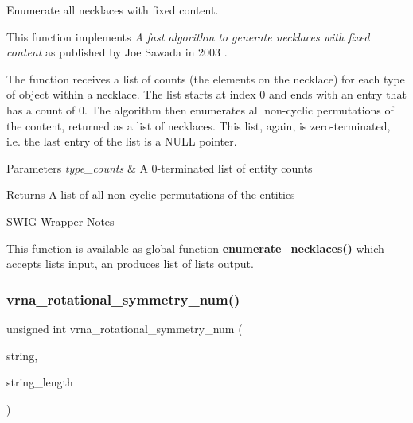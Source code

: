 Enumerate all necklaces with fixed content. 

This function implements {\itshape A fast algorithm to generate necklaces with fixed content} as published by Joe Sawada in 2003 \cite{sawada:2003}.

The function receives a list of counts (the elements on the necklace) for each type of object within a necklace. The list starts at index 0 and ends with an entry that has a count of 0. The algorithm then enumerates all non-\/cyclic permutations of the content, returned as a list of necklaces. This list, again, is zero-\/terminated, i.\+e. the last entry of the list is a {\ttfamily N\+U\+LL} pointer.


\begin{DoxyParams}{Parameters}
{\em type\+\_\+counts} & A 0-\/terminated list of entity counts \\
\hline
\end{DoxyParams}
\begin{DoxyReturn}{Returns}
A list of all non-\/cyclic permutations of the entities
\end{DoxyReturn}
\begin{DoxyRefDesc}{S\+W\+I\+G Wrapper Notes}
\item[\hyperlink{wrappers__wrappers000003}{S\+W\+I\+G Wrapper Notes}]This function is available as global function {\bfseries enumerate\+\_\+necklaces()} which accepts lists input, an produces list of lists output. \end{DoxyRefDesc}
\mbox{\label{group__combinatorics__utils_gac51464b5281833a58c25f9447252c495}} 
\subsubsection{\texorpdfstring{vrna\+\_\+rotational\+\_\+symmetry\+\_\+num()}{vrna\_rotational\_symmetry\_num()}}
{\footnotesize\ttfamily unsigned int vrna\+\_\+rotational\+\_\+symmetry\+\_\+num (\begin{DoxyParamCaption}\item[{const unsigned int $\ast$}]{string,  }\item[{size\+\_\+t}]{string\+\_\+length }\end{DoxyParamCaption})}



